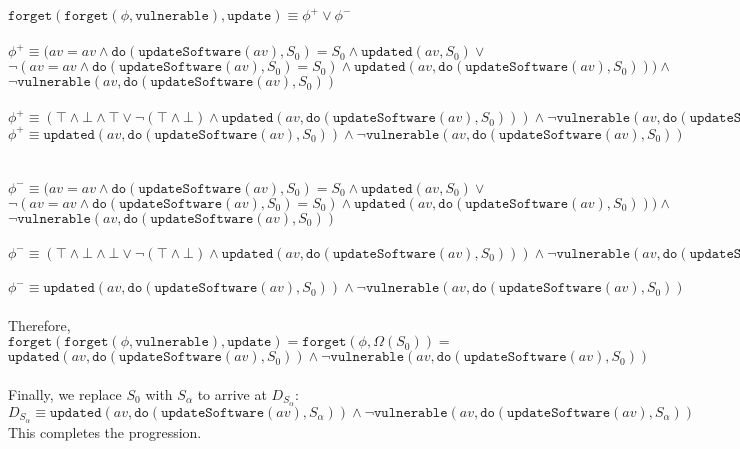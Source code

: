 \documentclass{assignment}
\begin{document}
\begin{problem}
\\
\(\texttt{forget}(\texttt{forget}(\phi, \texttt{vulnerable}), \texttt{update}) \equiv \phi^+ \lor \phi^-\)\\
\\
\(\phi^+\equiv(av=av\land \texttt{do}(\texttt{updateSoftware}(av), S_0)=S_0\land \texttt{updated}(av, S_0) \lor \)\\
\(\neg(av=av\land \texttt{do}(\texttt{updateSoftware}(av), S_0)=S_0)\land \texttt{updated}(av, \texttt{do}(\texttt{updateSoftware}(av), S_0))) \land \)\\
\(\neg\texttt{vulnerable}(av, \texttt{do}(\texttt{updateSoftware}(av), S_0))\)\\
\\
\(\phi^+\equiv (\top\land \bot \land \top \lor \neg(\top\land \bot)\land \texttt{updated}(av, \texttt{do}(\texttt{updateSoftware}(av), S_0))) \land  \neg\texttt{vulnerable}(av, \texttt{do}(\texttt{updateSoftware}(av), S_0))\)
\\
\(\phi^+ \equiv \texttt{updated}(av, \texttt{do}(\texttt{updateSoftware}(av), S_0)) \land  \neg\texttt{vulnerable}(av, \texttt{do}(\texttt{updateSoftware}(av), S_0))\)\\
\\
\\
\(\phi^-\equiv(av=av\land \texttt{do}(\texttt{updateSoftware}(av), S_0)=S_0\land \texttt{updated}(av, S_0) \lor \)\\
\(\neg(av=av\land \texttt{do}(\texttt{updateSoftware}(av), S_0)=S_0)\land \texttt{updated}(av, \texttt{do}(\texttt{updateSoftware}(av), S_0))) \land \)\\
\(\neg\texttt{vulnerable}(av, \texttt{do}(\texttt{updateSoftware}(av), S_0))\)\\
\\
\(\phi^-\equiv(\top\land \bot\land \bot \lor \neg(\top\land \bot)\land \texttt{updated}(av, \texttt{do}(\texttt{updateSoftware}(av), S_0))) \land \neg\texttt{vulnerable}(av, \texttt{do}(\texttt{updateSoftware}(av), S_0))\)\\
\\
\(\phi^-\equiv\texttt{updated}(av, \texttt{do}(\texttt{updateSoftware}(av), S_0)) \land \neg\texttt{vulnerable}(av, \texttt{do}(\texttt{updateSoftware}(av), S_0))\)\\
\\
Therefore, \\
\(\texttt{forget}(\texttt{forget}(\phi, \texttt{vulnerable}), \texttt{update})  =\texttt{forget}(\phi, \Omega(S_0))=\)
\[ \texttt{updated}(av, \texttt{do}(\texttt{updateSoftware}(av), S_0)) \land \neg\texttt{vulnerable}(av, \texttt{do}(\texttt{updateSoftware}(av), S_0))\]
\\
Finally, we replace $S_0$ with $S_\alpha$ to arrive at $D_{S_\alpha}$: \\
\[D_{S_\alpha}\equiv \texttt{updated}(av, \texttt{do}(\texttt{updateSoftware}(av), S_\alpha)) \land \neg\texttt{vulnerable}(av, \texttt{do}(\texttt{updateSoftware}(av), S_\alpha))\]
This completes the progression.
\end{problem}
\\
\end{document}

